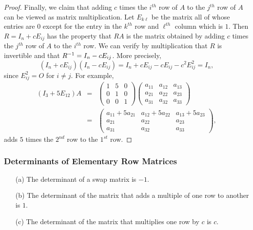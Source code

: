 \documentclass{ximera}
\begin{document}
\begin{proof}
Finally, we claim that adding $c$ times the $i^{th}$ row of $A$
to the $j^{th}$ row of $A$ can be viewed as matrix
multiplication.  Let $E_{k\ell}$ be the matrix all of whose
entries are $0$ except for the entry in the $k^{th}$ row and
$\ell^{th}$ column which is $1$.  Then $R=I_n+cE_{ij}$ has the
property that $RA$ is the matrix obtained by adding $c$ times
the $j^{th}$ row of $A$ to the $i^{th}$ row.  We can verify by
multiplication that $R$ is invertible and that
$R^{-1}=I_n-cE_{ij}$.  More precisely,
\[
(I_n+cE_{ij})(I_n-cE_{ij})=I_n+cE_{ij}-cE_{ij}-c^2E_{ij}^2=I_n,
\]
since $E_{ij}^2 = O$ for $i\not= j$.  For example,
\begin{eqnarray*}
(I_3 + 5E_{12})A &  = & \left(\begin{array}{ccc} 1 & 5 & 0\\ 0 & 1 & 0 \\ 0 & 0 & 1\end{array}\right)
\left(\begin{array}{ccc} a_{11} & a_{12} & a_{13}\\ a_{21} & a_{22} & a_{23}
 \\ a_{31} & a_{32} & a_{33} \end{array}\right) \\ & = & 
\left(\begin{array}{ccc} a_{11}+5a_{21} & a_{12}+5a_{22} & a_{13}+5a_{23} \\ 
a_{21} & a_{22} & a_{23} \\ a_{31} & a_{32} & a_{33} \end{array}\right),
\end{eqnarray*}
adds $5$ times the $2^{nd}$ row to the $1^{st}$ row.   \end{proof}

\subsubsection*{Determinants of Elementary Row Matrices}

\begin{lemma}  \label{L:detelemrowmat}
\begin{itemize}
\item[(a)] The determinant of a swap matrix is $-1$.
\item[(b)] The determinant of the matrix that adds a multiple
of one row to another is $1$.
\item[(c)] The determinant of the matrix that multiplies one
row by $c$ is $c$.
\end{itemize}
\end{lemma}  
 
\end{document}
